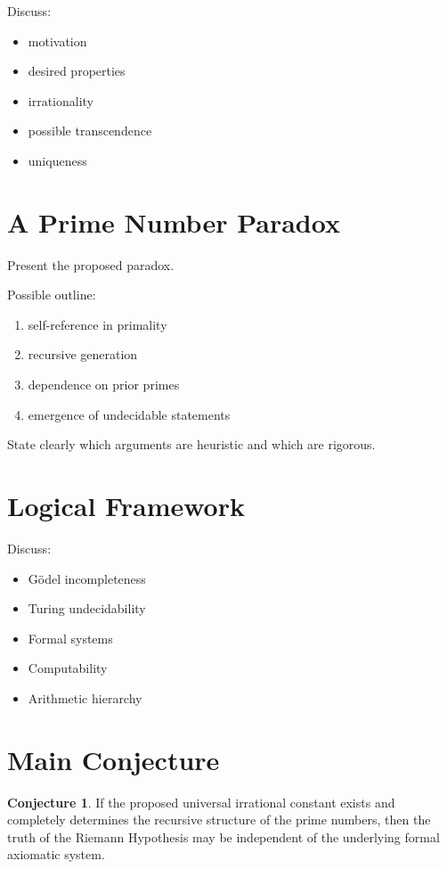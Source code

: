 \documentclass[11pt]{article}
\theoremstyle{definition}
\newtheorem{conjecture}[theorem]{Conjecture}
\theoremstyle{remark}
\begin{document}
Discuss:

\begin{itemize}
\item motivation
\item desired properties
\item irrationality
\item possible transcendence
\item uniqueness
\end{itemize}

\section{A Prime Number Paradox}

Present the proposed paradox.

Possible outline:

\begin{enumerate}
\item self-reference in primality
\item recursive generation
\item dependence on prior primes
\item emergence of undecidable statements
\end{enumerate}

State clearly which arguments are heuristic and which are rigorous.

\section{Logical Framework}

Discuss:

\begin{itemize}
\item Gödel incompleteness
\item Turing undecidability
\item Formal systems
\item Computability
\item Arithmetic hierarchy
\end{itemize}

\section{Main Conjecture}

\begin{conjecture}

If the proposed universal irrational constant exists and completely determines the recursive structure of the prime numbers, then the truth of the Riemann Hypothesis may be independent of the underlying formal axiomatic system.

\end{conjecture}
\end{document}
